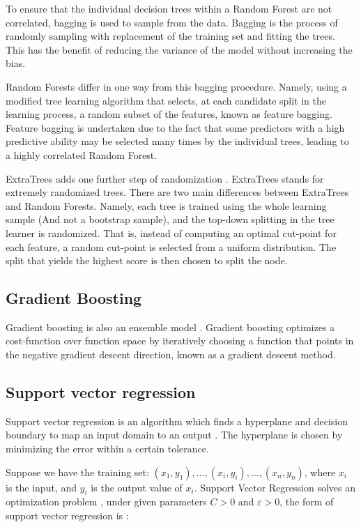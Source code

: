 To ensure that the individual decision trees within a Random Forest are not correlated, bagging is used to sample from the data. Bagging is the process of randomly sampling with replacement of the training set and fitting the trees. This has the benefit of reducing the variance of the model without increasing the bias. 

Random Forests differ in one way from this bagging procedure. Namely, using a modified tree learning algorithm that selects, at each candidate split in the learning process, a random subset of the features, known as feature bagging. Feature bagging is undertaken due to the fact that some predictors with a high predictive ability may be selected many times by the individual trees, leading to a highly correlated Random Forest.

ExtraTrees adds one further step of randomization \cite{Fike1988}. ExtraTrees stands for extremely randomized trees. There are two main differences between ExtraTrees and Random Forests. Namely, each tree is trained using the whole learning sample (And not a bootstrap sample), and the top-down splitting in the tree learner is randomized. That is, instead of computing an optimal cut-point for each feature, a random cut-point is selected from a uniform distribution. The split that yields the highest score is then chosen to split the node. 


\subsection{Gradient Boosting}

Gradient boosting is also an ensemble model \cite{316}. Gradient boosting optimizes a cost-function over function space by iteratively choosing a function that points in the negative gradient descent direction, known as a gradient descent method.

\subsection{Support vector regression}

Support vector regression is an algorithm which finds a hyperplane and decision boundary to map an input domain to an output \cite{Cortes1995}. The hyperplane is chosen by minimizing the error within a certain tolerance.

Suppose we have the training set: $(x_1,y_1), \ldots,(x_i,y_i),\ldots,(x_n,y_n)$, where $x_i$ is the input, and $y_i$ is the output value of $x_i$. Support Vector Regression solves an optimization problem \cite{Shu2006,Chen2004}, under given parameters $C>0$ and $\varepsilon >0$, the form of support vector regression is \cite{Drucker1997}: 

